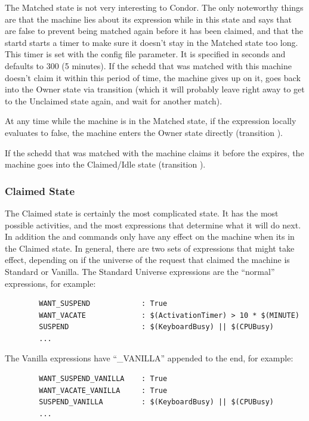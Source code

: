 The Matched state is not very interesting to Condor.  The only
noteworthy things are that the machine lies about its 
expression while in this state and says that  are
false to prevent being matched again before it has been claimed, and
that the startd starts a timer to make sure it doesn't stay in the
Matched state too long.  This timer is set with the
 \label{param:MatchTimeout} config file
parameter.  It is specified in seconds and defaults to 300 (5
minutes).  If the schedd that was matched with this machine doesn't
claim it within this period of time, the machine gives up on it, goes
back into the Owner state via transition  (which it will
probably leave right away to get to the Unclaimed state again, and
wait for another match). 

At any time while the machine is in the Matched state, if the
 expression locally evaluates to false, the machine enters
the Owner state directly (transition ).

If the schedd that was matched with the machine claims it before the
 expires, the machine goes into the Claimed/Idle
state (transition ).

\subsubsection{Claimed State}
\label{sec:Claimed-State}

The Claimed state is certainly the most complicated state.
It has the most possible activities, and the most expressions that
determine what it will do next.
In addition the  and  commands only
have any effect on the machine when its in the Claimed state.
In general, there are two sets of expressions that might take effect,
depending on if the universe of the request that claimed the machine is
Standard or Vanilla.
The Standard Universe expressions are the ``normal'' expressions, for
example:
\begin{verbatim}
        WANT_SUSPEND            : True
        WANT_VACATE             : $(ActivationTimer) > 10 * $(MINUTE)
        SUSPEND                 : $(KeyboardBusy) || $(CPUBusy)
        ...
\end{verbatim}

The Vanilla expressions have ``\_VANILLA'' appended to the end, for
example:
\begin{verbatim}
        WANT_SUSPEND_VANILLA    : True
        WANT_VACATE_VANILLA     : True
        SUSPEND_VANILLA         : $(KeyboardBusy) || $(CPUBusy)
        ...
\end{verbatim}

